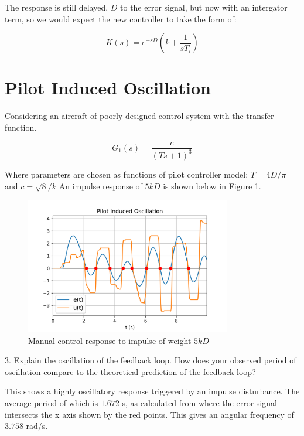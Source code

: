 \documentclass[8pt]{article}
\begin{document}
The response is still delayed, $D$ to the error signal, but now with an intergator term, so we would expect the new controller to take the form of:

\begin{equation}
    K(s) = e^{-sD}\left( k + \frac{1}{sT_i}\right)
\end{equation}

\section{Pilot Induced Oscillation}

Considering an aircraft of poorly designed control system with the transfer function.

\begin{equation}
    G_1(s) = \frac{c}{(Ts+1)^3}
\end{equation}

Where parameters are chosen as functions of pilot controller model: $T=4D/\pi$ and $c=\sqrt{8}/k$
An impulse response of $5kD$ is shown below in Figure \ref{fig:figure4}.

\begin{figure}[H]
    \centering
    \includegraphics[width=0.8\textwidth]{figures/FIGURE_4.png}
    \caption{Manual control response to impulse of weight $5kD$}
    \label{fig:figure4}
\end{figure}

3. Explain the oscillation of the feedback loop. How does your observed period of oscillation compare to the theoretical prediction of the feedback loop?

This shows a highly oscillatory response triggered by an impulse disturbance.
The average period of which is $1.672$ s, as calculated from where the error signal intersects the x axis shown by the red points.
This gives an angular frequency of $3.758$ rad/s.
\end{document}

